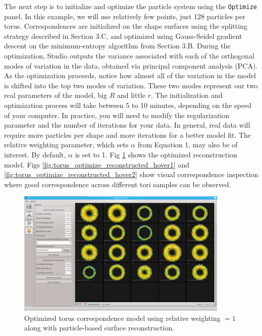 \documentclass[letterpaper,12pt]{article}   %
\begin{document}
The next step is to initialize and optimize the particle system using the \texttt{Optimize} panel. In this example, we will use relatively few points, just
128 particles per torus. Correspondences are initialized on the shape surfaces using the splitting strategy described in Section 3.C, and optimized using Gauss-Seidel gradient descent on the minimum-entropy algorithm from Section 3.B. During the optimization, Studio outputs the variance associated with each of the orthogonal modes of variation in the data, obtained via principal component analysis (PCA).  As the optimization proceeds, notice how almost all of the variation in the model is shifted into the top two modes of variation. These two modes represent our two real parameters of the model, big $R$ and little $r$. The initialization and optimization process will take between 5 to 10 minutes, depending on the speed of your computer. In practice, you will need to modify the regularization parameter and the number of iterations for your data. In general, real data will require more particles per shape and more iterations for a better model fit. The relative weighting parameter, which sets $\alpha$ from
Equation 1, may also be of interest. By default, $\alpha$ is set to 1. Fig \ref{fig:torus_optimize_reconstructed} shows the optimized reconstruction model.  Figs \ref{fig:torus_optimize_reconstructed_hover1} and \ref{fig:torus_optimize_reconstructed_hover2} show visual correspondence inspection where good correspondence across different tori samples can be observed.

\begin{figure}[!htp]
	\centering
	\includegraphics[width=0.9\textwidth]{figs_v2/torus_optimize_reconstructed.png}
	\caption{Optimized torus correspondence model using relative weighting $ = 1$ along with particle-based surface reconstruction.}
	\label{fig:torus_optimize_reconstructed}
\end{figure}
\end{document}
